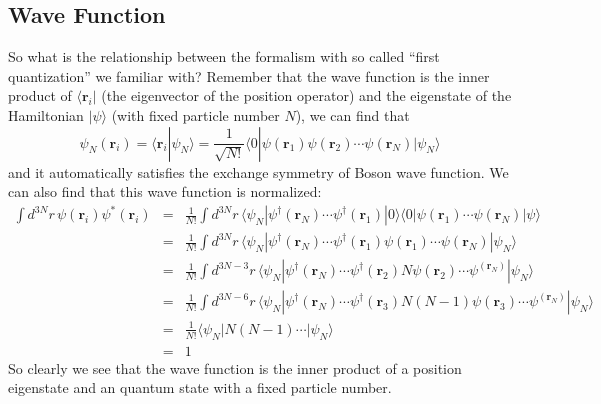 \documentclass{article}
\newcommand{\pnr}{\mathbf{r}}
\begin{document}
\subsection{Wave Function}
So what is the relationship between the formalism with so called ``first quantization'' we familiar with? Remember that the wave function is the inner product of $\langle \pnr_i|$ (the eigenvector of the position operator) and the eigenstate of the Hamiltonian $|\psi\rangle$ (with fixed particle number $N$), we can find that
\begin{equation}
\psi_{N}(\pnr_i) = \langle \pnr_i | \psi_N\rangle = \frac{1}{\sqrt{N!}}\langle 0| \psi(\pnr_1) \psi(\pnr_2)\cdots \psi(\pnr_N)|\psi_N\rangle
\end{equation}
and it automatically satisfies the exchange symmetry of Boson wave function. We can also find that this wave function is normalized:
\begin{eqnarray}
\int d^{3N}r\,\psi(\pnr_i)\psi^*(\pnr_i) &=& \frac{1}{N!}\int d^{3N}r\,\langle \psi_N | \psi^\dagger(\pnr_N)\cdots\psi^\dagger(\pnr_1)|0\rangle \langle 0|\psi(\pnr_1)\cdots \psi(\pnr_N)|\psi\rangle\nonumber\\
&=& \frac{1}{N!}\int d^{3N}r \, \langle \psi_N |\psi^\dagger(\pnr_N)\cdots \psi^\dagger(\pnr_1)\psi(\pnr_1)\cdots \psi(\pnr_N)|\psi_N\rangle\nonumber\\
&=&\frac{1}{N!} \int d^{3N-3}r \, \langle \psi_N|\psi^\dagger(\pnr_N) \cdots\psi^\dagger(\pnr_2)N\psi(\pnr_2)\cdots \psi^(\pnr_N)|\psi_N\rangle \nonumber\\
&=& \frac{1}{N!} \int d^{3N-6}r \, \langle \psi_N|\psi^\dagger(\pnr_N) \cdots\psi^\dagger(\pnr_3)N(N-1)\psi(\pnr_3)\cdots \psi^(\pnr_N)|\psi_N\rangle \nonumber\\
&=& \frac{1}{N!}\langle \psi_N| N(N-1)\cdots |\psi_N\rangle\nonumber\\
&=& 1
\end{eqnarray}
So clearly we see that the wave function is the inner product of a position eigenstate and an quantum state with a fixed particle number.
\end{document}
